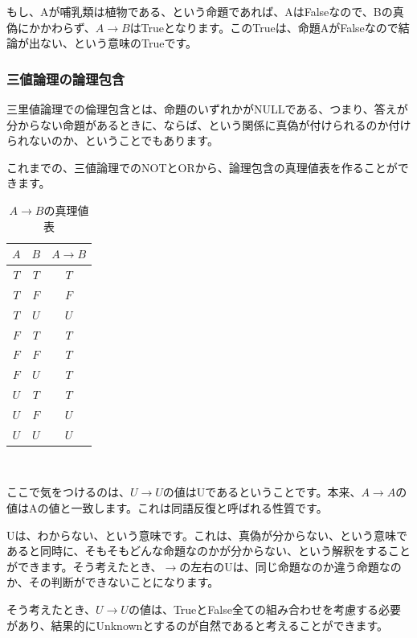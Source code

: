 もし、Aが哺乳類は植物である、という命題であれば、AはFalseなので、Bの真偽にかかわらず、$A \to B$はTrueとなります。このTrueは、命題AがFalseなので結論が出ない、という意味のTrueです。

\subsubsection{三値論理の論理包含}
三里値論理での倫理包含とは、命題のいずれかがNULLである、つまり、答えが分からない命題があるときに、ならば、という関係に真偽が付けられるのか付けられないのか、ということでもあります。

これまでの、三値論理でのNOTとORから、論理包含の真理値表を作ることができます。

\begin{table}[htb]
  \begin{tabular}{|c|c|c|} \hline
    $A$ & $B$ & $A \to B$ \\ \hline
    $T$ & $T$ & $T$ \\
    $T$ & $F$ & $F$ \\
    $T$ & $U$ & $U$ \\
    $F$ & $T$ & $T$ \\
    $F$ & $F$ & $T$ \\
    $F$ & $U$ & $T$ \\
    $U$ & $T$ & $T$ \\
    $U$ & $F$ & $U$ \\
    $U$ & $U$ & $U$\\ \hline
  \end{tabular}
　　\label{chart:impliment}
　　\caption{$A \to B$の真理値表}
\end{table}



ここで気をつけるのは、$U \to U$の値はUであるということです。本来、$A \to A$の値はAの値と一致します。これは同語反復と呼ばれる性質です。

Uは、わからない、という意味です。これは、真偽が分からない、という意味であると同時に、そもそもどんな命題なのかが分からない、という解釈をすることができます。そう考えたとき、$\to$の左右のUは、同じ命題なのか違う命題なのか、その判断ができないことになります。

そう考えたとき、$U \to U$の値は、TrueとFalse全ての組み合わせを考慮する必要があり、結果的にUnknownとするのが自然であると考えることができます。